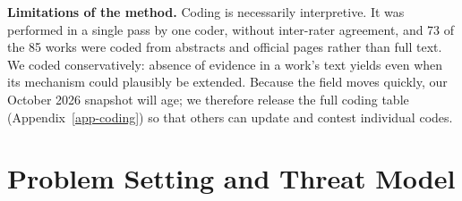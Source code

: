 \documentclass[conference]{IEEEtran}
\newcommand{\none}{{\small\Circle}}
\begin{document}
\textbf{Limitations of the method.} Coding is necessarily interpretive. It was performed in a single pass by one coder, without inter-rater agreement, and 73 of the 85 works were coded from abstracts and official pages rather than full text. We coded conservatively: absence of evidence in a work's text yields \none{} even when its mechanism could plausibly be extended. Because the field moves quickly, our October 2026 snapshot will age; we therefore release the full coding table (Appendix~\ref{app-coding}) so that others can update and contest individual codes.

\section{Problem Setting and Threat Model}\label{sec-3}
\end{document}
